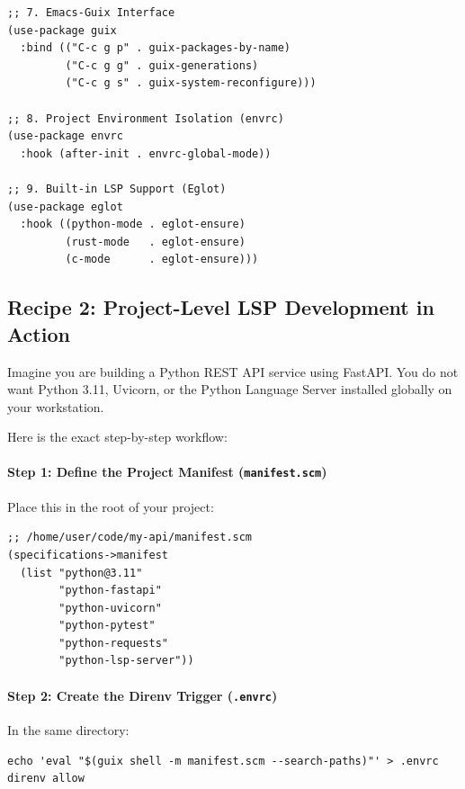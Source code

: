 \begin{lstlisting}[style=guixscheme]
;; 7. Emacs-Guix Interface
(use-package guix
  :bind (("C-c g p" . guix-packages-by-name)
         ("C-c g g" . guix-generations)
         ("C-c g s" . guix-system-reconfigure)))

;; 8. Project Environment Isolation (envrc)
(use-package envrc
  :hook (after-init . envrc-global-mode))

;; 9. Built-in LSP Support (Eglot)
(use-package eglot
  :hook ((python-mode . eglot-ensure)
         (rust-mode   . eglot-ensure)
         (c-mode      . eglot-ensure)))
\end{lstlisting}

\subsection{Recipe 2: Project-Level LSP Development in Action}

Imagine you are building a Python REST API service using FastAPI. You do not want Python 3.11, Uvicorn, or the Python Language Server installed globally on your workstation.

Here is the exact step-by-step workflow:

\paragraph{Step 1: Define the Project Manifest (\texttt{manifest.scm})}
Place this in the root of your project:
\begin{lstlisting}[style=guixscheme]
;; /home/user/code/my-api/manifest.scm
(specifications->manifest
  (list "python@3.11"
        "python-fastapi"
        "python-uvicorn"
        "python-pytest"
        "python-requests"
        "python-lsp-server"))
\end{lstlisting}

\paragraph{Step 2: Create the Direnv Trigger (\texttt{.envrc})}
In the same directory:
\begin{lstlisting}[style=guixcli]
echo 'eval "$(guix shell -m manifest.scm --search-paths)"' > .envrc
direnv allow
\end{lstlisting}

